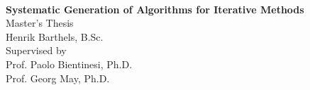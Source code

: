 
\begin{titlepage}


\\[5cm]

\begin{center}
\sffamily
{\Huge \bfseries \sffamily Systematic Generation of Algorithms for Iterative Methods\\[0.5cm]}
{\Large \sffamily Master's Thesis\\[1.5cm]}
{\Large \sffamily Henrik Barthels, B.Sc.\\}
{\vfill}
{Supervised by\\
Prof. Paolo Bientinesi, Ph.D.\\
Prof. Georg May, Ph.D.}
\end{center}
\end{titlepage}